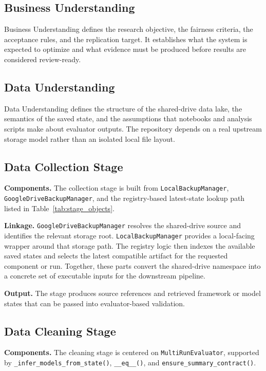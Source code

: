 \documentclass{IEEEtran}
\begin{document}
\subsection{Business Understanding}
Business Understanding defines the research objective, the fairness criteria,
the acceptance rules, and the replication target. It establishes what the
system is expected to optimize and what evidence must be produced before results
are considered review-ready.

\subsection{Data Understanding}
Data Understanding defines the structure of the shared-drive data lake, the
semantics of the saved state, and the assumptions that notebooks and analysis
scripts make about evaluator outputs. The repository depends on a real upstream
storage model rather than an isolated local file layout.

\subsection{Data Collection Stage}
\textbf{Components.} The collection stage is built from
\texttt{LocalBackupManager}, \texttt{GoogleDriveBackupManager}, and the
registry-based latest-state lookup path listed in Table~\ref{tab:stage_objects}.

\textbf{Linkage.} \texttt{GoogleDriveBackupManager} resolves the shared-drive
source and identifies the relevant storage root. \texttt{LocalBackupManager}
provides a local-facing wrapper around that storage path. The registry logic
then indexes the available saved states and selects the latest compatible
artifact for the requested component or run. Together, these parts convert the
shared-drive namespace into a concrete set of executable inputs for the
downstream pipeline.

\textbf{Output.} The stage produces source references and retrieved framework or
model states that can be passed into evaluator-based validation.

\subsection{Data Cleaning Stage}
\textbf{Components.} The cleaning stage is centered on
\texttt{MultiRunEvaluator}, supported by \texttt{\_infer\_models\_from\_state()},
\texttt{\_\_eq\_\_()}, and \texttt{ensure\_summary\_contract()}.
\end{document}
